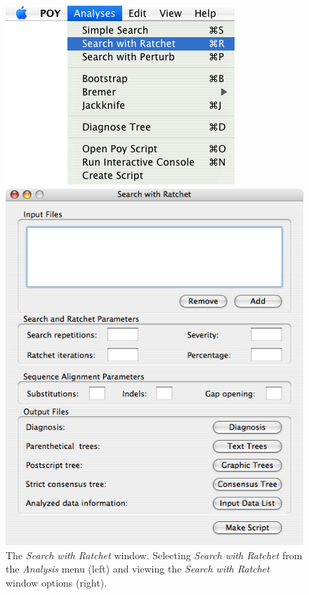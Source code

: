 \begin{figure}
\centering
\begin{minipage}[c]{0.48\textwidth}
   		\includegraphics[width=\textwidth]{figures/searchwithratchet_menu.jpg}
\end{minipage}
\quad
\begin{minipage}[c]{0.48\textwidth}
	   	\includegraphics[width=\textwidth]{figures/searchwithratchet_window.jpg}
   	\end{minipage}
	
\caption{The \emph{Search with Ratchet} window. Selecting \emph{Search with Ratchet} from the \emph{Analysis} menu (left) and viewing the \emph{Search with Ratchet} window options (right).}
\label{fig:search_with_ratchet_window}
\end{figure}

